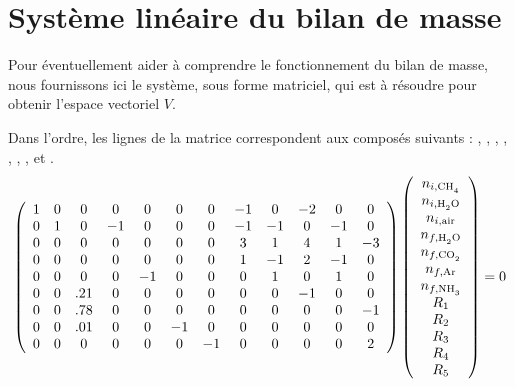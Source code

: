 \section{Système linéaire du bilan de masse}\label{appendix:matrix}

Pour éventuellement aider à comprendre le fonctionnement du bilan de masse, nous fournissons ici le système, sous forme matriciel, qui est à résoudre pour obtenir l'espace vectoriel $V$.

Dans l'ordre, les lignes de la matrice correspondent aux composés suivants : , , , , , ,  ,  et .
\[
\left(
\begin{array}{*{12}c}
  1 & 0 & 0 & 0 & 0 & 0 & 0 & -1 & 0 & -2 & 0 & 0 \\
  0 & 1 & 0 & -1 & 0 & 0 & 0 & -1 & -1 & 0 & -1 & 0 \\
  0 & 0 & 0 & 0 & 0 & 0 & 0 & 3 & 1 & 4 & 1 & -3 \\
  0 & 0 & 0 & 0 & 0 & 0 & 0 & 1 & -1 & 2 & -1 & 0 \\
  0 & 0 & 0 & 0 & -1 & 0 & 0 & 0 & 1 & 0 & 1 & 0 \\
  0 & 0 & .21 & 0 & 0 & 0 & 0 & 0 & 0 & -1 & 0 & 0 \\
  0 & 0 & .78 & 0 & 0 & 0 & 0 & 0 & 0 & 0 & 0 & -1 \\
  0 & 0 & .01 & 0 & 0 & -1 & 0 & 0 & 0 & 0 & 0 & 0 \\
  0 & 0 & 0 & 0 & 0 & 0 & -1 & 0 & 0 & 0 & 0 & 2
\end{array}
\right)
\left(
\begin{array}{*{1}c}
  n_{i,\ce{CH4}} \\ n_{i,\ce{H2O}} \\ n_{i,\text{air}} \\ n_{f,\ce{H2O}} \\ n_{f,\ce{CO2}} \\ n_{f,\ce{Ar}} \\ n_{f,\ce{NH3}} \\ R_1 \\ R_2 \\ R_3 \\ R_4 \\ R_5
\end{array}
\right)
= 0
\]

